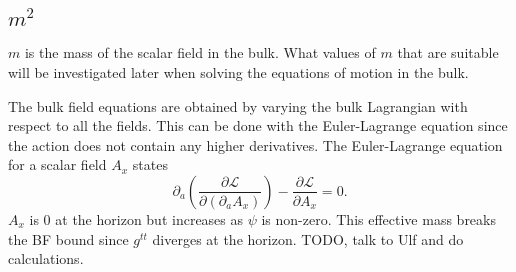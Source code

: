 \documentclass[12pt]{report}
\newcommand{\At}{\ensuremath{{A_x}}}
\begin{document}
\subsection{$m^2$}
$m$ is the mass of the scalar field in the bulk. What values of $m$ that are suitable will be investigated later when solving the equations of motion in the bulk.

The bulk field equations are obtained by varying the bulk Lagrangian with respect to all the fields. This can be done with the Euler-Lagrange equation since the action does not contain any higher derivatives. The Euler-Lagrange equation for a scalar field $\At$ states
\begin{equation}
 \partial_a\left(\frac{\partial\mathcal{L}}{\partial(\partial_a\At)}\right)-\frac{\partial\mathcal{L}}{\partial\At}=0.
\end{equation}
$\At$ is 0 at the horizon but increases as $\psi$ is non-zero. This effective mass breaks the BF bound since $g^{tt}$ diverges at the horizon. TODO, talk to Ulf and do calculations.
\end{document}
